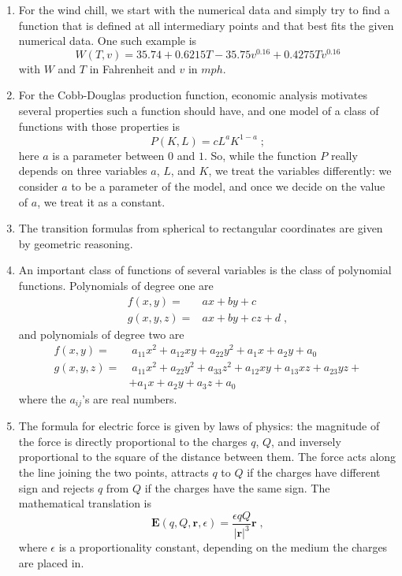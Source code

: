 \begin{enumerate}
  \item For the wind chill, we start with the numerical
  data and simply try to find a function that is defined
  at all intermediary points and that best fits the given
  numerical data. One such example is
  $$W(T,v)= 35.74+0.6215 T - 35.75 v^{0.16} +0.4275 Tv^{0.16}$$
  with $W$ and $T$ in Fahrenheit and $v$ in $mph$.

  \item For the Cobb-Douglas production function, economic
  analysis motivates several properties such a function
  should have, and one model of  a class of functions with
  those properties is
  $$P(K,L) = cL^a K^{1-a}\; ;$$
    here $a$ is a parameter between $0$ and $1$. So, while
    the function $P$ really depends on three variables $a$,
    $L$, and $K$, we treat the variables differently: we
    consider $a$ to be a parameter of the model, and once
    we decide on the value of $a$, we treat it as a constant.

    \item The transition formulas from spherical to
    rectangular coordinates are given by geometric reasoning.

    \item An important class of functions of several variables
    is the class of
    polynomial functions. Polynomials
    of degree one are
    \begin{align*}
    f(x,y) = & ax+by+c \\
      g(x,y,z) = & ax+by+cz+d  \; ,
    \end{align*}
    and polynomials of degree two are
    \begin{align*}
      f(x,y) = & \; a_{11}x^2+a_{12}xy+a_{22}y^2+ a_1 x + a_2 y + a_0 \\
      g(x,y,z) = & \; a_{11} x^2 + a_{22}y^2 + a_{33}z^2 + a_{12}xy + a_{13}xz+a_{23}yz + \\
      & + a_1 x + a_2 y + a_3 z + a_0
    \end{align*}
    where the $a_{ij}$'s are real numbers.

    \item The formula for electric force is given by
    laws of physics: the magnitude of the force is directly
    proportional to the charges $q$, $Q$, and inversely
    proportional to the square of the distance between them.
    The force acts along the line joining the two points,
    attracts $q$ to $Q$ if the charges have different sign
    and rejects $q$ from $Q$ if the charges have the same
    sign. The mathematical translation is
    $$\textbf{E}(q, Q, \textbf{r}, \epsilon) =
    \frac{\epsilon q Q}{|\textbf{r}|^3} \textbf{r}\; ,$$
    where $\epsilon$ is a proportionality constant,
    depending on the medium the charges are placed in.
\end{enumerate}

